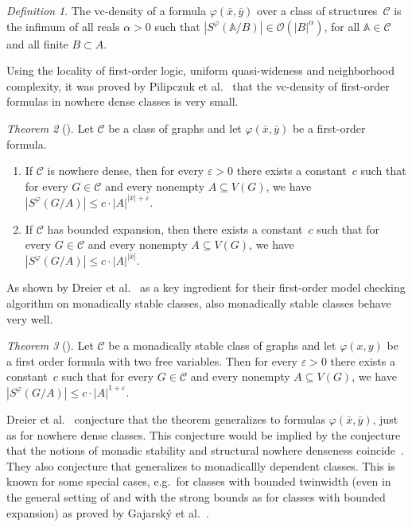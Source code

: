 \documentclass[1p,number,a4paper]{elsarticle}
\theoremstyle{remark}
\newcommand{\Oof}{\mathcal{O}}
\newcommand{\Cc}{\mathscr{C}}
\newcommand{\strA}{\mathbb{A}}
\renewcommand{\phi}{\varphi}
\renewcommand{\epsilon}{\varepsilon}
\newtheorem{theorem}{Theorem}[section]
\newtheorem{definition}[theorem]{Definition}
\begin{document}
\begin{definition}
The vc-density of a formula $\phi(\bar x,\bar y)$ over a class of structures~$\Cc$
is the infimum of all reals $\alpha>0$
such that $|S^\phi(\strA/B)|\in \Oof(|B|^\alpha)$,
for all $\strA\in \Cc$ and all finite $B\subset A$.
\end{definition}

Using the locality of first-order logic, uniform quasi-wideness and neighborhood complexity, it was proved by Pilipczuk et al.~\cite{pilipczuk2018number} that the vc-density of first-order formulas in nowhere dense classes is very small. 

\begin{theorem}[\cite{pilipczuk2018number}]\label{thm:vc-density-nd}
Let $\Cc$ be a class of graphs and let $\phi(\bar x,\bar y)$ be a first-order formula. 
\begin{enumerate}[(1)]
\item If $\Cc$ is nowhere dense, then for every $\epsilon>0$ 
there exists a constant~$c$ such that for every $G\in \Cc$ and every nonempty
$A\subseteq V(G)$, we have $|S^\phi(G/A)|\leq c\cdot |A|^{|\bar x|+\epsilon}.$
\item If $\Cc$ has bounded expansion, then there exists a constant~$c$ such that for every $G\in \Cc$ and every nonempty $A\subseteq V(G)$, we have $|S^\phi(G/A)|\leq c\cdot |A|^{|\bar x|}$.
\end{enumerate}
 \end{theorem}

As shown by Dreier et al.~\cite{dreier2023first} as a key ingredient for their first-order model checking algorithm on monadically stable classes, also monadically stable classes behave very well.

\begin{theorem}[\cite{dreier2023first}]\label{thm:vc-density-ms}
    Let $\Cc$ be a monadically stable class of graphs and let $\phi(x,y)$ be a first order formula with two free variables. Then for every $\epsilon>0$ 
there exists a constant~$c$ such that for every $G\in \Cc$ and every nonempty
$A\subseteq V(G)$, we have $|S^\phi(G/A)|\leq c\cdot |A|^{1+\epsilon}.$
\end{theorem}

Dreier et al.~\cite{dreier2023first} conjecture that the theorem generalizes to formulas $\phi(\bar x,\bar y)$, just as  for nowhere dense classes. This conjecture would be implied by the conjecture that the notions of monadic stability and structural nowhere denseness coincide~\cite{ossona2021first,de2021sparsity}. 
They also conjecture that  generalizes to monadicallly dependent classes. 
This is known for some special cases, e.g.\ for classes with bounded twinwidth (even in the general setting of  and with the strong bounds as for classes with bounded expansion) as proved by Gajarsk\'y et al.~\cite{GajarskyPPT22}. 
\end{document}
